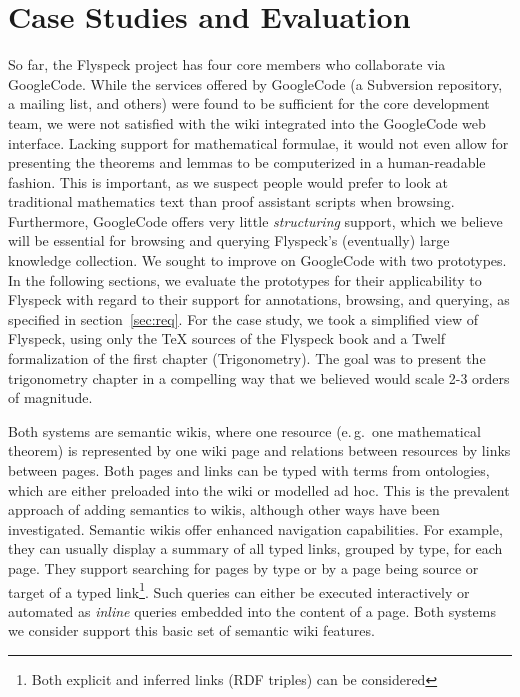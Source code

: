 \section{Case Studies and Evaluation}

So far, the Flyspeck project has four core members who collaborate via
GoogleCode\cite{website:FlyspeckProjectPage}.  While the services offered by
GoogleCode (a Subversion repository, a mailing list, and others) were
found to be sufficient for the core development team, we were not
satisfied with the wiki integrated into the GoogleCode web interface.
Lacking support for mathematical formulae, it would not even allow for
presenting the theorems and lemmas to be computerized in a
human-readable fashion.  This is important, as we suspect people would
prefer to look at traditional mathematics text than proof assistant
scripts when browsing.  Furthermore, GoogleCode offers very
little \emph{structuring} support, which we believe will be
essential for browsing and querying Flyspeck's 
(eventually) large knowledge collection.  We sought to improve
on GoogleCode with two prototypes.  
In the following sections, we evaluate the prototypes 
for their applicability to Flyspeck with regard to their
support for annotations, browsing, and querying, as specified in
section~\ref{sec:req}.  For the case study, we took a simplified 
view of Flyspeck, using only the {\TeX} sources of the
Flyspeck book and a Twelf formalization of the first chapter (Trigonometry).
The goal was to present the trigonometry chapter in a compelling way
that we believed would scale 2-3 orders of magnitude.  

Both systems are semantic wikis, where one resource %
(e.\,g.\
one mathematical theorem) is represented by one wiki page and relations between
resources by links between pages.  Both pages and links can be typed with terms
from ontologies\cite{OrDeMoVoHa06:annotation-navigation-semwiki}, which are
either preloaded into the wiki or modelled
ad hoc\cite{KrSchVr:semwiki-reasoning07}.  This is the prevalent approach of
adding semantics to wikis, although other ways have been
investigated\cite{semwiki06}.  Semantic wikis offer enhanced navigation
capabilities.  For example, they can usually display a summary of all typed
links, grouped by type, for each page.  They support searching for pages by type
or by a page being source or target of a typed link\footnote{Both explicit and
  inferred links (RDF triples) can be
  considered\cite{KrSchVr:semwiki-reasoning07}}.  Such queries can either be
executed interactively or automated as \emph{inline} queries embedded
into the content of a page\cite{KrSchVr:semwiki-reasoning07}.  Both systems we
consider support this basic set of semantic wiki features.

